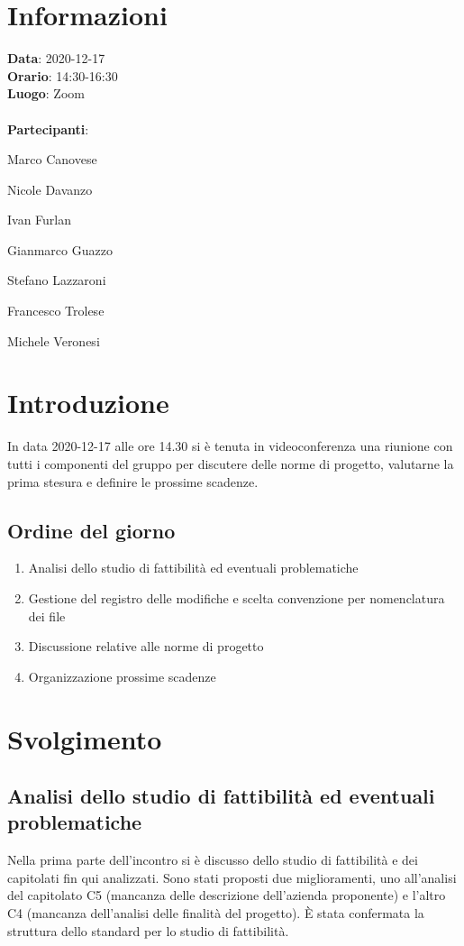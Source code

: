 \section{Informazioni}
\textbf{Data}: 2020-12-17\\
\textbf{Orario}: 14:30-16:30\\
\textbf{Luogo}: Zoom\\\\
\textbf{Partecipanti}:\begin{list}{*}{\setlength{\itemsep}{0cm}}
	\item Marco Canovese
	\item Nicole Davanzo
	\item Ivan Furlan
	\item Gianmarco Guazzo
	\item Stefano Lazzaroni
	\item Francesco Trolese
	\item Michele Veronesi
\end{list}

\section{Introduzione}
In data 2020-12-17 alle ore 14.30 si è tenuta in videoconferenza una riunione con tutti i componenti del gruppo per discutere delle norme di progetto, valutarne la prima stesura e definire le prossime scadenze.
\subsection{Ordine del giorno}
\begin{enumerate}
    \item Analisi dello studio di fattibilità ed eventuali problematiche
    \item Gestione del registro delle modifiche e scelta convenzione per nomenclatura dei file
    \item Discussione relative alle norme di progetto
    \item Organizzazione prossime scadenze 
\end{enumerate}

\section{Svolgimento}
\subsection{Analisi dello studio di fattibilità ed eventuali problematiche}
Nella prima parte dell'incontro si è discusso dello studio di fattibilità e dei capitolati fin qui analizzati. Sono stati proposti due miglioramenti, uno all'analisi del capitolato C5 (mancanza delle descrizione dell'azienda proponente) e l'altro C4 (mancanza dell'analisi delle finalità del progetto). È stata confermata la struttura dello standard per lo studio di fattibilità. 

